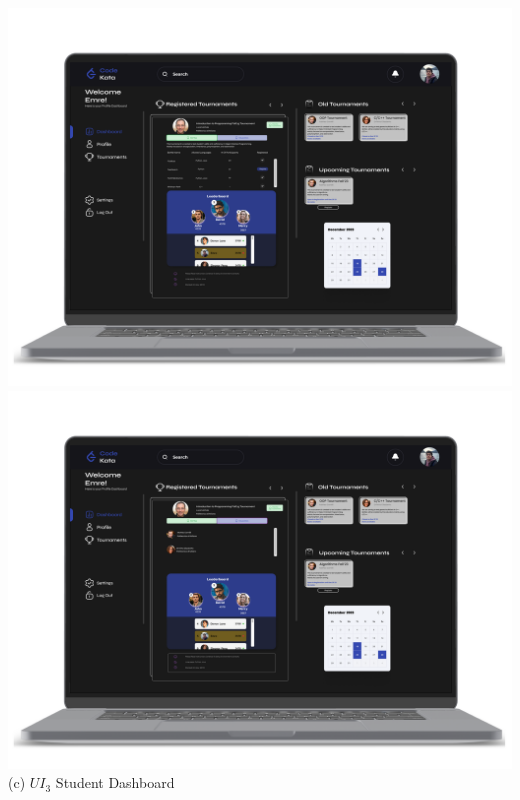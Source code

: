 \newpage
\begin{center}
    \includegraphics[scale=0.13]{Images/ui-ux/student_dashboard_1.png}
    \includegraphics[scale=0.13]{Images/ui-ux/student_dashboard_2.png}
        (c) $UI_{3}$ Student Dashboard
\end{center}
